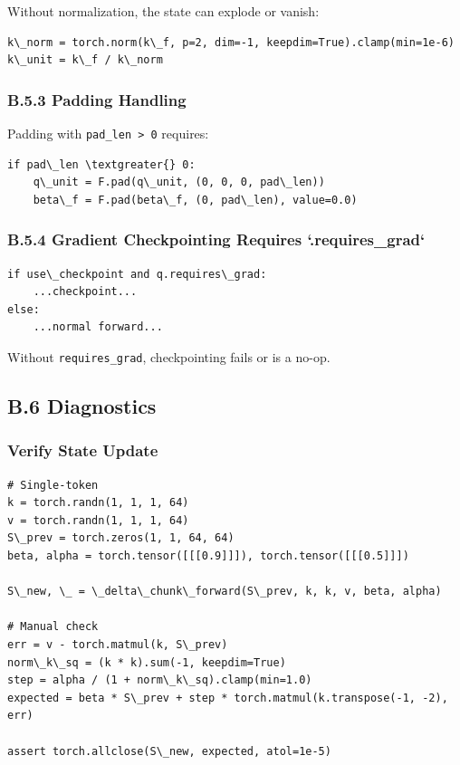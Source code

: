 Without normalization, the state can explode or vanish:

\begin{lstlisting}
k\_norm = torch.norm(k\_f, p=2, dim=-1, keepdim=True).clamp(min=1e-6)
k\_unit = k\_f / k\_norm
\end{lstlisting}

\subsubsection{B.5.3 Padding Handling}

Padding with \texttt{pad\_len \textgreater{} 0} requires:

\begin{lstlisting}
if pad\_len \textgreater{} 0:
    q\_unit = F.pad(q\_unit, (0, 0, 0, pad\_len))
    beta\_f = F.pad(beta\_f, (0, pad\_len), value=0.0)
\end{lstlisting}

\subsubsection{B.5.4 Gradient Checkpointing Requires `.requires\_grad`}

\begin{lstlisting}
if use\_checkpoint and q.requires\_grad:
    ...checkpoint...
else:
    ...normal forward...
\end{lstlisting}

Without \texttt{requires\_grad}, checkpointing fails or is a no-op.

\subsection{B.6 Diagnostics}

\subsubsection{Verify State Update}

\begin{lstlisting}
# Single-token
k = torch.randn(1, 1, 1, 64)
v = torch.randn(1, 1, 1, 64)
S\_prev = torch.zeros(1, 1, 64, 64)
beta, alpha = torch.tensor([[[0.9]]]), torch.tensor([[[0.5]]])

S\_new, \_ = \_delta\_chunk\_forward(S\_prev, k, k, v, beta, alpha)

# Manual check
err = v - torch.matmul(k, S\_prev)
norm\_k\_sq = (k * k).sum(-1, keepdim=True)
step = alpha / (1 + norm\_k\_sq).clamp(min=1.0)
expected = beta * S\_prev + step * torch.matmul(k.transpose(-1, -2), err)

assert torch.allclose(S\_new, expected, atol=1e-5)
\end{lstlisting}

